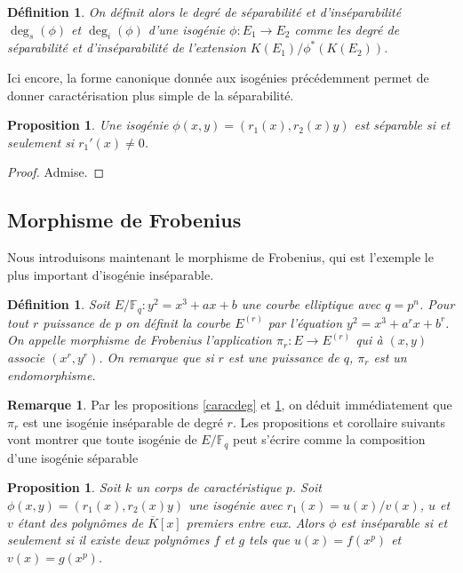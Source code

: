 \documentclass{article}
\theoremstyle{plain}%
\newtheorem{prop}[thm]{Proposition}
\newtheorem{deff}[thm]{Définition}
\theoremstyle{definition}%
\newtheorem{rem}[thm]{Remarque}
\newcommand{\F}{\mathbb{F}}
\begin{document}
\begin{deff}
On définit alors le degré de séparabilité et d'inséparabilité $\deg_s(\phi)$ et $\deg_i(\phi)$ d’une isogénie $\phi : E_1 \to E_2$ comme les degré de séparabilité et d'inséparabilité de l’extension $K(E_1)/\phi^*(K(E_2 ))$.
\end{deff}


Ici encore, la forme canonique donnée aux isogénies précédemment permet de donner caractérisation plus
simple de la séparabilité.

\begin{prop}
  \label{caracsep}
  Une isogénie $\phi(x, y) = (r_1(x), r_2(x)y)$ est séparable si et seulement si $r_1'(x) \neq 0$.
\end{prop}

\begin{proof}
  Admise.
\end{proof}

\subsection{Morphisme de Frobenius}

Nous introduisons maintenant le morphisme de Frobenius, qui est l'exemple le plus important d'isogénie inséparable.

\begin{deff}
  Soit $E/\F_q : y^2 = x^3 + ax + b$ une courbe elliptique avec $q = p^n$. Pour tout $r$ puissance de $p$ on définit la courbe $E^{(r)}$ par l'équation $y^2 = x^3 + a^r x + b^r$. On appelle morphisme de Frobenius l'application $\pi_r : E \to E^{(r)}$ qui à $(x, y)$ associe $(x^r, y^r)$. On remarque que si $r$ est une puissance de $q$, $\pi_r$ est un endomorphisme.
\end{deff}


\begin{rem}
  \label{degpi}
  Par les propositions \ref{caracdeg} et \ref{caracsep}, on déduit immédiatement que $\pi_r$ est une isogénie inséparable de degré $r$. Les propositions et corollaire suivants vont montrer que toute isogénie de $E/\F_q$ peut s'écrire comme la composition d'une isogénie séparable 
\end{rem}



\begin{prop}
  Soit $k$ un corps de caractéristique $p$. Soit $\phi(x, y) = (r_1(x), r_2(x)y)$ une isogénie avec $r_1(x) = u(x)/v(x)$, $u$ et $v$ étant des polynômes de $\overline{K}[x]$ premiers entre eux. Alors $\phi$ est inséparable si et seulement si il existe deux polynômes $f$ et $g$ tels que $u(x) = f(x^p)$ et $v(x) = g(x^p)$.
\end{prop}
\end{document}
